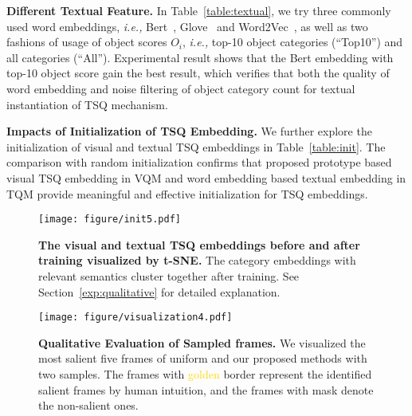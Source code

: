 \documentclass[runningheads]{llncs}
\newcommand{\tabref}[1]{Table~\ref{#1}}
\newcommand{\secref}[1]{Section~\ref{#1}}
\begin{document}
\noindent \textbf{Different Textual Feature.}
In \tabref{table:textual}, we try three commonly used word embeddings, \emph{i.e.,} Bert~\cite{bert}, Glove~\cite{glove} and Word2Vec~\cite{word2vec}, as well as two fashions of usage of object scores $O_i$, \emph{i.e.,} top-10 object categories (``Top10'') and all categories (``All'').
Experimental result shows that the Bert embedding with top-10 object score gain the best result, which verifies that both the quality of word embedding and noise filtering of object category count for textual instantiation of TSQ mechanism.



\noindent\textbf{Impacts of Initialization of TSQ Embedding.}
We further explore the initialization of visual and textual TSQ embeddings in \tabref{table:init}. 
The comparison with random initialization confirms that proposed prototype based visual TSQ embedding in VQM and word embedding based textual embedding in TQM provide meaningful and effective initialization for TSQ embeddings. 


\begin{figure}[!t] \centering \texttt{[image: figure/init5.pdf]} \caption{\textbf{The visual and textual TSQ embeddings before and after training visualized by t-SNE. }The category embeddings with relevant semantics cluster together after training. See \secref{exp:qualitative} for detailed explanation. 
} \label{q_init} \end{figure}
\begin{figure}[!t] \centering \texttt{[image: figure/visualization4.pdf]} \caption{\textbf{Qualitative Evaluation of Sampled frames.} We visualized the most salient five frames of uniform and our proposed methods with two samples. The frames with \textcolor{Gold}{golden} border represent the identified salient frames by human intuition, and the frames with mask denote the non-salient ones. } \label{qualitative_example} \end{figure}
\end{document}
